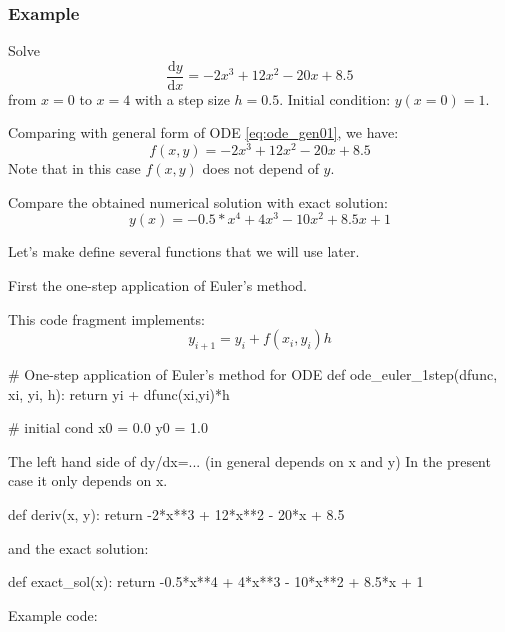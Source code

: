 \begin{frame}
\frametitle{Example}
Solve
\begin{equation*}
\frac{\mathrm{d}y}{\mathrm{d}x} = -2x^3 + 12x^2 - 20x + 8.5
\end{equation*}
from $x = 0$ to $x = 4$ with a step size $h=0.5$.
Initial condition: $y(x=0) = 1$.

Comparing with general form of ODE \eqref{eq:ode_gen01}, we have:
\begin{equation*}
f(x,y) = -2x^3 + 12x^2 - 20x + 8.5
\end{equation*}
Note that in this case $f(x,y)$ does not depend of $y$.

Compare the obtained numerical solution with exact solution:
\begin{equation*}
y(x) = -0.5*x^4 + 4x^3 - 10x^2 + 8.5x + 1
\end{equation*}

\end{frame}


\begin{frame}[fragile]

Let's make define several functions that we will use later.

First the one-step application of Euler's method.

This code fragment implements:
\begin{equation*}
y_{i+1} = y_{i} + f(x_i, y_i) h
\end{equation*}

\begin{pythoncode}
# One-step application of Euler's method for ODE
def ode_euler_1step(dfunc, xi, yi, h):
    return yi + dfunc(xi,yi)*h

# initial cond
x0 = 0.0
y0 = 1.0
\end{pythoncode}

\end{frame}



\begin{frame}[fragile]

The left hand side of dy/dx=... (in general depends on x and y)
In the present case it only depends on x.
\begin{pythoncode}
def deriv(x, y):
    return -2*x**3 + 12*x**2 - 20*x + 8.5
\end{pythoncode}

and the exact solution:
\begin{pythoncode}
def exact_sol(x):
    return -0.5*x**4 + 4*x**3 - 10*x**2 + 8.5*x + 1
\end{pythoncode}

Example code: 

\end{frame}


